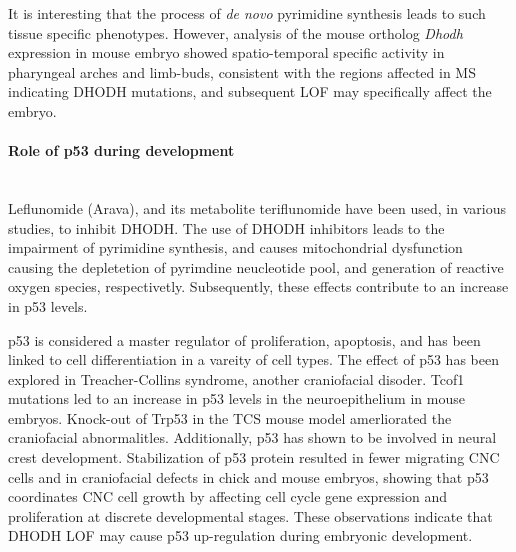 \documentclass[12pt]{article}
\begin{document}
It is interesting that the process of \textit{de novo} pyrimidine synthesis leads to such tissue specific phenotypes. However, analysis of the mouse ortholog \textit{Dhodh} expression in mouse embryo showed spatio-temporal specific activity in pharyngeal arches and limb-buds, consistent with the regions affected in MS indicating DHODH mutations, and subsequent LOF may specifically affect the embryo.

\paragraph{Role of p53 during development}
~\\ Leflunomide (Arava), and its metabolite teriflunomide have been used, in various studies, to inhibit DHODH. The use of DHODH inhibitors leads to the impairment of pyrimidine synthesis, and causes mitochondrial dysfunction causing the depletetion of pyrimdine neucleotide pool, and generation of reactive oxygen species, respectivetly. Subsequently, these effects contribute to an increase in p53 levels.

p53 is considered a master regulator of proliferation, apoptosis, and has been linked to cell differentiation in a vareity of cell types. The effect of p53 has been explored in Treacher-Collins syndrome, another craniofacial disoder. Tcof1 mutations led to an increase in p53 levels in the neuroepithelium in mouse embryos. Knock-out of Trp53 in the TCS mouse model amerliorated the craniofacial abnormalitles. Additionally, p53 has shown to be involved in neural crest development. Stabilization of p53 protein resulted in fewer migrating CNC cells and in craniofacial defects in chick and mouse embryos, showing that p53 coordinates CNC cell growth by affecting cell cycle gene expression and proliferation at discrete developmental stages. These observations indicate that DHODH LOF may cause p53 up-regulation during embryonic development. 
\end{document}
